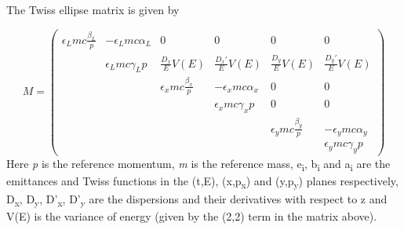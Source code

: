 The Twiss ellipse matrix is given by

\begin{equation*}
M=\left(\begin{matrix}\epsilon _Lmc\frac{\beta _L}{p}&-\epsilon _Lmc\alpha _L&0&0&0&0\\&\epsilon _Lmc\gamma
_Lp&\frac{D_x}{E}V(E)&\frac{D_x'}{E}V(E)&\frac{D_y}{E}V(E)&\frac{D_y'}{E}V(E)\\&&\epsilon _xmc\frac{\beta _x}{p}&-\epsilon
_xmc\alpha _x&0&0\\&&&\epsilon _xmc\gamma _xp&0&0\\&&&&\epsilon _ymc\frac{\beta _y}{p}&-\epsilon _ymc\alpha
_y\\&&&&&\epsilon _ymc\gamma _yp\end{matrix}\right)
\end{equation*}
Here \textit{p} is the reference momentum, \textit{m} is the reference mass, e\textsubscript{i}, b\textsubscript{i} and
a\textsubscript{i} are the emittances and Twiss functions in the (t,E), (x,p\textsubscript{x}) and
(y,p\textsubscript{y}) planes respectively, D\textsubscript{x}, D\textsubscript{y}, D'\textsubscript{x},
D'\textsubscript{y} are the dispersions and their derivatives with respect to z and V(E) is the variance of energy
(given by the (2,2) term in the matrix above).

